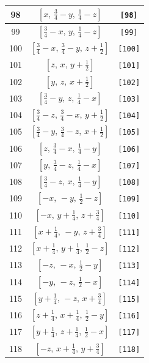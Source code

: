\documentclass[fleqn,8pt]{jsarticle}
\begin{document}
\begin{longtable}{ccc}
98 & $\left[ x,\, \frac{3}{4} - y,\, \frac{1}{4} - z \right]$ & {\tt [98]} \\ \hline
99 & $\left[ \frac{3}{4} - x,\, y,\, \frac{1}{4} - z \right]$ & {\tt [99]} \\ \hline
100 & $\left[ \frac{3}{4} - x,\, \frac{3}{4} - y,\, z + \frac{1}{2} \right]$ & {\tt [100]} \\ \hline
101 & $\left[ z,\, x,\, y + \frac{1}{2} \right]$ & {\tt [101]} \\ \hline
102 & $\left[ y,\, z,\, x + \frac{1}{2} \right]$ & {\tt [102]} \\ \hline
103 & $\left[ \frac{3}{4} - y,\, z,\, \frac{1}{4} - x \right]$ & {\tt [103]} \\ \hline
104 & $\left[ \frac{3}{4} - z,\, \frac{3}{4} - x,\, y + \frac{1}{2} \right]$ & {\tt [104]} \\ \hline
105 & $\left[ \frac{3}{4} - y,\, \frac{3}{4} - z,\, x + \frac{1}{2} \right]$ & {\tt [105]} \\ \hline
106 & $\left[ z,\, \frac{3}{4} - x,\, \frac{1}{4} - y \right]$ & {\tt [106]} \\ \hline
107 & $\left[ y,\, \frac{3}{4} - z,\, \frac{1}{4} - x \right]$ & {\tt [107]} \\ \hline
108 & $\left[ \frac{3}{4} - z,\, x,\, \frac{1}{4} - y \right]$ & {\tt [108]} \\ \hline
109 & $\left[ - x,\, - y,\, \frac{1}{2} - z \right]$ & {\tt [109]} \\ \hline
110 & $\left[ - x,\, y + \frac{1}{4},\, z + \frac{3}{4} \right]$ & {\tt [110]} \\ \hline
111 & $\left[ x + \frac{1}{4},\, - y,\, z + \frac{3}{4} \right]$ & {\tt [111]} \\ \hline
112 & $\left[ x + \frac{1}{4},\, y + \frac{1}{4},\, \frac{1}{2} - z \right]$ & {\tt [112]} \\ \hline
113 & $\left[ - z,\, - x,\, \frac{1}{2} - y \right]$ & {\tt [113]} \\ \hline
114 & $\left[ - y,\, - z,\, \frac{1}{2} - x \right]$ & {\tt [114]} \\ \hline
115 & $\left[ y + \frac{1}{4},\, - z,\, x + \frac{3}{4} \right]$ & {\tt [115]} \\ \hline
116 & $\left[ z + \frac{1}{4},\, x + \frac{1}{4},\, \frac{1}{2} - y \right]$ & {\tt [116]} \\ \hline
117 & $\left[ y + \frac{1}{4},\, z + \frac{1}{4},\, \frac{1}{2} - x \right]$ & {\tt [117]} \\ \hline
118 & $\left[ - z,\, x + \frac{1}{4},\, y + \frac{3}{4} \right]$ & {\tt [118]} \\ \hline

\end{longtable}
\end{document}
